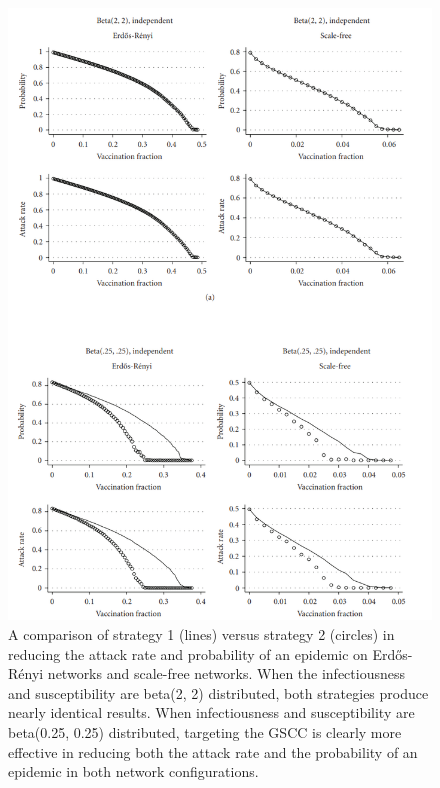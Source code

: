\begin{figure}[p]
  \centering
  \includegraphics[width=12cm]{3/epigraphs}
  \caption{A comparison of strategy 1 (lines) versus strategy 2 (circles) in reducing the attack rate and probability of an epidemic on Erd\H{o}s-R\'{e}nyi networks and scale-free
    networks. When the infectiousness and susceptibility are beta(2, 2) distributed, both strategies produce nearly identical
  results. When infectiousness and susceptibility are beta(0.25, 0.25) distributed, targeting the GSCC is clearly more effective in reducing both the attack rate and the
probability of an epidemic in both network configurations.\cite{Kenah}}
  \label{fig:epidemiology graphs}
\end{figure}


